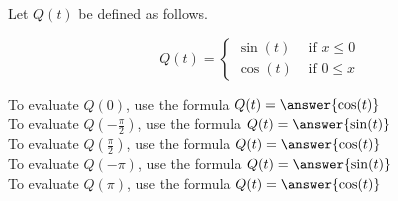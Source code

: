\documentclass{ximera}
\author{Lee Wayand}
\begin{document}
\begin{exercise}




Let $Q(t)$ be defined as follows.

\[
Q(t) = 
\begin{cases}
  \sin(t) & \text{ if }  x \le 0 \\
  \cos(t) & \text{ if } 0 \leq x 
\end{cases}
\]



To evaluate $Q(0)$, use the formula $Q(t) = \answer{\cos(t)}$ \\


To evaluate $Q\left( -\frac{\pi}{2} \right)$, use the formula $Q(t) = \answer{\sin(t)}$ \\


To evaluate $Q\left( \frac{\pi}{2} \right)$, use the formula $Q(t) = \answer{\cos(t)}$ \\


To evaluate $Q(-\pi)$, use the formula $Q(t) = \answer{\sin(t)}$ \\


To evaluate $Q(\pi)$, use the formula $Q(t) = \answer{\cos(t)}$ \\




\end{exercise}
\end{document}
